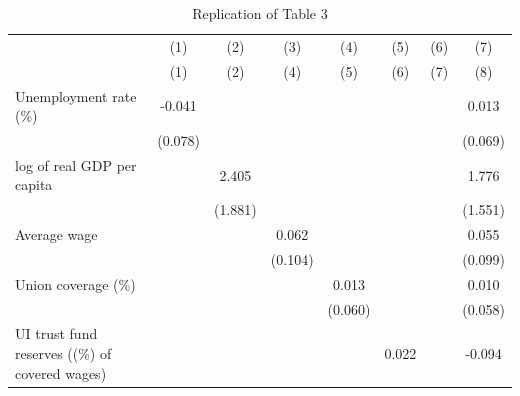 \begin{table}[htbp]\centering
\def\sym#1{\ifmmode^{#1}\else\(^{#1}\)\fi}
\caption{Replication of Table 3}
\begin{tabular}{l*{7}{c}}
\toprule
                    &\multicolumn{1}{c}{(1)}&\multicolumn{1}{c}{(2)}&\multicolumn{1}{c}{(3)}&\multicolumn{1}{c}{(4)}&\multicolumn{1}{c}{(5)}&\multicolumn{1}{c}{(6)}&\multicolumn{1}{c}{(7)}\\
                    &\multicolumn{1}{c}{(1)}&\multicolumn{1}{c}{(2)}&\multicolumn{1}{c}{(4)}&\multicolumn{1}{c}{(5)}&\multicolumn{1}{c}{(6)}&\multicolumn{1}{c}{(7)}&\multicolumn{1}{c}{(8)}\\
\midrule
Unemployment rate (\%)&      -0.041         &                     &                     &                     &                     &                     &       0.013         \\
                    &     (0.078)         &                     &                     &                     &                     &                     &     (0.069)         \\
\addlinespace
log of real GDP per capita&                     &       2.405         &                     &                     &                     &                     &       1.776         \\
                    &                     &     (1.881)         &                     &                     &                     &                     &     (1.551)         \\
\addlinespace
Average wage        &                     &                     &       0.062         &                     &                     &                     &       0.055         \\
                    &                     &                     &     (0.104)         &                     &                     &                     &     (0.099)         \\
\addlinespace
Union coverage (\%) &                     &                     &                     &       0.013         &                     &                     &       0.010         \\
                    &                     &                     &                     &     (0.060)         &                     &                     &     (0.058)         \\
\addlinespace
UI trust fund reserves ((\%) of covered wages)&                     &                     &                     &                     &       0.022         &                     &      -0.094         \\

\end{tabular}
\end{table}
